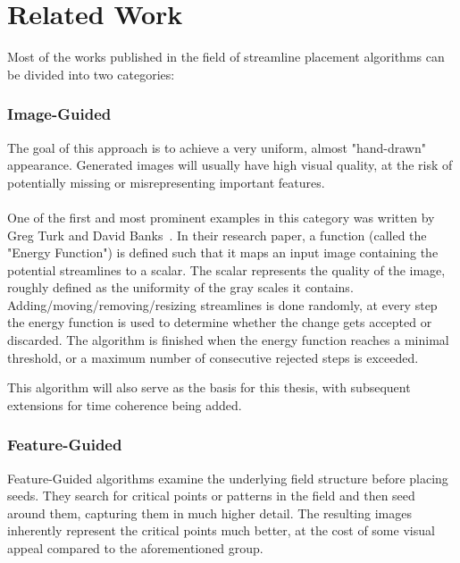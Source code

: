 \chapter{Related Work}
\label{sec:relatedWork}

Most of the works published in the field of streamline placement algorithms can be divided into two categories:
\subsection{Image-Guided}
The goal of this approach is to achieve a very uniform, almost "hand-drawn" appearance.
Generated images will usually have high visual quality, at the risk of potentially missing or misrepresenting important features.
\\\\
One of the first and most prominent examples in this category was written by Greg Turk and David Banks~\cite{TurkBanks}.
In their research paper, a function (called the "Energy Function") is defined such that it maps an input image containing the potential streamlines to a scalar.
The scalar represents the quality of the image, roughly defined as the uniformity of the gray scales it contains. 
Adding/moving/removing/resizing streamlines is done randomly, at every step the energy function is used to determine whether the change gets accepted or discarded.
The algorithm is finished when the energy function reaches a minimal threshold, or a maximum number of consecutive rejected steps is exceeded.

This algorithm will also serve as the basis for this thesis, with subsequent extensions for time coherence being added.

\subsection{Feature-Guided}
Feature-Guided algorithms examine the underlying field structure before placing seeds.
They search for critical points or patterns in the field and then seed around them, capturing them in much higher detail.
The resulting images inherently represent the critical points much better, at the cost of some visual appeal compared to the aforementioned group.
\bigskip

\begin{center}
    
\end{center}


